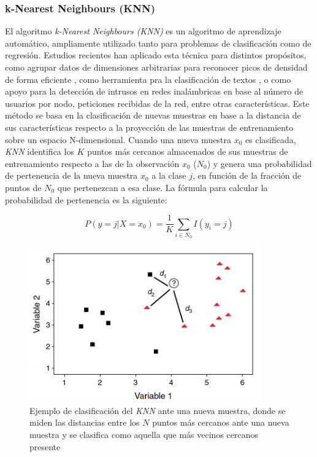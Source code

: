 \subsubsection*{k-Nearest Neighbours (KNN)}

El algoritmo \textit{k-Nearest Neighbours (KNN)} es un algoritmo de aprendizaje automático, ampliamente utilizado tanto para problemas de clasificación como de regresión. Estudios recientes han aplicado esta técnica para distintos propósitos, como agrupar datos de dimensiones arbitrarias para reconocer picos de densidad de forma eficiente \cite{chen2020fast}, como herramienta pra la clasificación de textos \cite{CHEN2020523}, o como apoyo para la detección de intrusos en redes inalámbricas \cite{liu2022enhanced} en base al número de usuarios por nodo, peticiones recibidas de la red, entre otras características. Este método se basa en la clasificación de nuevas muestras en base a la distancia de sus características respecto a la proyección de las muestras de entrenamiento sobre un espacio N-dimensional. Cuando una nueva muestra $x_0$ es clasificada, \textit{KNN} identifica los $K$ puntos más cercanos almacenados de sus muestras de entrenamiento respecto a las de la observación $x_0$ ($N_0$) y genera una probabilidad de pertenencia de la nueva muestra $x_0$ a la clase $j$, en función de la fracción de puntos de $N_0$ que pertenezcan a esa clase. La fórmula para calcular la probabilidad de pertenencia es la siguiente:

\[
P(y = j | X = x_0)  = \frac{1}{K} \sum_{i\in N_0} I(y_i = j)
\]

\begin{figure}[H]
	\centering
	\includegraphics[width=10cm]{Figures/Background/KNN.png}
	\caption{Ejemplo de clasificación del \textit{KNN} ante una nueva muestra, donde se miden las distancias entre los $N$ puntos más cercanos ante una nueva muestra y se clasifica como aquella que más vecinos cercanos presente \cite{VIDUEIRAFERREIRA2015195}}
	\label{KNN_BACKGROUND}
\end{figure}


